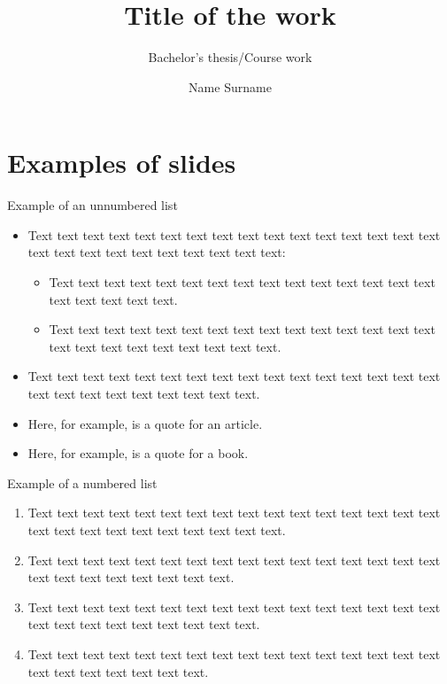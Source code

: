 \documentclass[12pt]{beamer}
\title[]{Title of the work}
\subtitle[]{Bachelor's thesis/Course work}
\author[Name Surname]{Name Surname}
\date{}
\begin{document}
\begin{frame}
    \titlepage
\end{frame}

\section{Examples of slides}

\begin{frame}{Example of an unnumbered list}
    \begin{itemize}
    \item Text text text text text text text text text text text text text text text text text text text text text text text text text text:
        \begin{itemize}
        \item Text text text text text text text text text text text text text text text text text text text text.
        \item Text text text text text text text text text text text text text text text text text text text text text text text text.
        \end{itemize}
    \item Text text text text text text text text text text text text text text text text text text text text text text text text text.
    \item Here, for example, is a quote for an article\cite{Januschowski_2020}.
    \item Here, for example, is a quote for a book\cite{Abraham_2009}.
    \end{itemize}
\end{frame}

\begin{frame}{Example of a numbered list}
    \begin{enumerate}
    \item Text text text text text text text text text text text text text text text text text text text text text text text text text text.
    \item Text text text text text text text text text text text text text text text text text text text text text text text text.
    \item Text text text text text text text text text text text text text text text text text text text text text text text text text.
    \item Text text text text text text text text text text text text text text text text text text text text text text text.
    \end{enumerate}
\end{frame}
\end{document}
